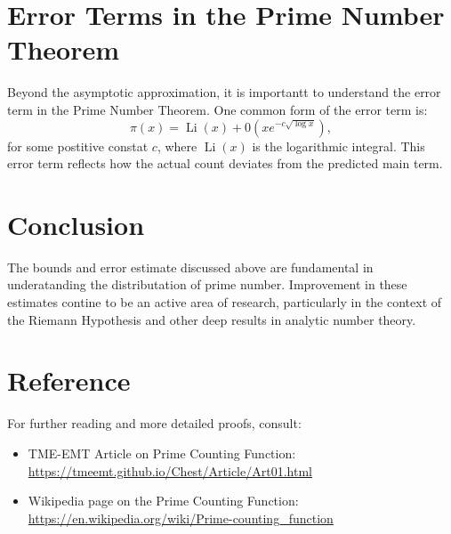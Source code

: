\section{Error Terms in the Prime Number Theorem}
Beyond the asymptotic approximation, it is importantt to understand the error term in the Prime Number Theorem. One common form of the error term is:
\[
\pi(x) = \operatorname{Li}(x) + 0\left(x e^{-c\sqrt{\log x}}\right),
\]
for some postitive constat $c$, where $\operatorname{Li}(x)$ is the logarithmic integral. This error term reflects how the actual count deviates from the predicted main term.

\section{Conclusion}
The bounds and error estimate discussed above are fundamental in underatanding the distributation of prime number. Improvement in these estimates contine to be an active area of research, particularly in the context of the Riemann Hypothesis and other deep results in analytic number theory.

\section{Reference}
For further reading and more detailed proofs, consult:
\begin{itemize} 
	\item TME-EMT Article on Prime Counting Function: \url{https://tmeemt.github.io/Chest/Article/Art01.html}
	\item Wikipedia page on the Prime Counting Function: \url{https://en.wikipedia.org/wiki/Prime-counting_function}
\end{itemize}
